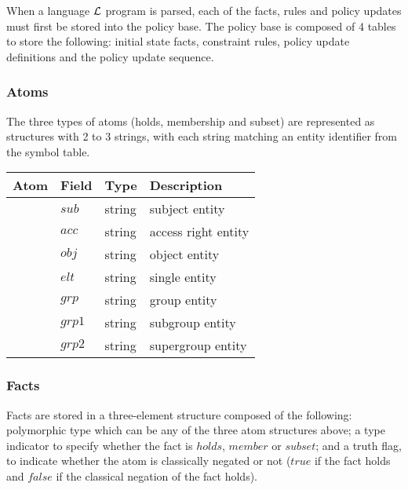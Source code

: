 \documentclass[glov2,twocolumn,final]{svjour2}
\newenvironment{vquote}
  {\begin{list}{}{\leftmargin 1em}\item[]}
  {\end{list}}
\begin{document}
      When a language ${\cal L}$ program is parsed, each of the facts,
      rules and policy updates must first be stored into the policy base.
      The policy base is composed of 4 tables to store the following:
      initial state facts, constraint rules, policy update definitions and
      the policy update sequence.

      \subsubsection{Atoms}

        The three types of atoms (holds, membership and subset) are
        represented as structures with 2 to 3 strings, with each string
        matching an entity identifier from the symbol table.

        \begin{vquote}
          \begin{tabular}[t]{|l|l|l|l|}
            \hline
            \textbf{Atom} & \textbf{Field} & \textbf{Type} & \textbf{Description} \\
            \hline
            {\multirow{3}{*}{holds}} & $sub$ & string & subject entity \\
            \cline{2-4}
            & $acc$ & string & access right entity \\
            \cline{2-4}
            & $obj$ & string & object entity \\
            \hline
            {\multirow{2}{*}{member}} & $elt$ & string & single entity \\
            \cline{2-4}
            & $grp$ & string & group entity \\
            \hline
            {\multirow{2}{*}{subset}} & $grp1$ & string & subgroup entity \\
            \cline{2-4}
            & $grp2$ & string & supergroup entity \\
            \hline
          \end{tabular}
        \end{vquote}

      \subsubsection{Facts}

        Facts are stored in a three-element structure composed of the
        following: polymorphic type which can be any of the three atom
        structures above; a type indicator to specify whether the fact is
        $holds$, $member$ or $subset$; and a truth flag, to indicate whether the
        atom is classically negated or not ($true$ if the fact holds
        and $false$ if the classical negation of the fact holds).
\end{document}
